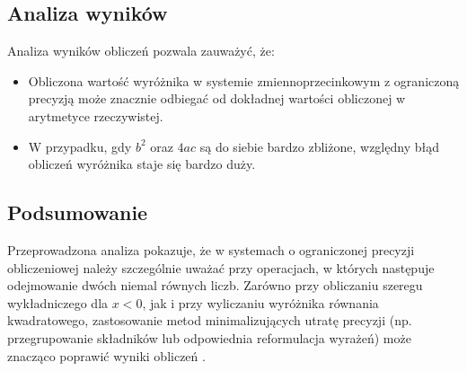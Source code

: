 \documentclass{article}
\begin{document}
\newpage

\subsection{Analiza wyników}

Analiza wyników obliczeń pozwala zauważyć, że:
\begin{itemize}
    \item Obliczona wartość wyróżnika w systemie zmiennoprzecinkowym z ograniczoną precyzją może znacznie odbiegać od dokładnej wartości obliczonej w arytmetyce rzeczywistej.
    \item W przypadku, gdy \(b^2\) oraz \(4ac\) są do siebie bardzo zbliżone, względny błąd obliczeń wyróżnika staje się bardzo duży.
\end{itemize}

\subsection{Podsumowanie}

Przeprowadzona analiza pokazuje, że w systemach o ograniczonej precyzji obliczeniowej należy szczególnie uważać przy operacjach, w których następuje odejmowanie dwóch niemal równych liczb. Zarówno przy obliczaniu szeregu wykładniczego dla \(x<0\), jak i przy wyliczaniu wyróżnika równania kwadratowego, zastosowanie metod minimalizujących utratę precyzji (np. przegrupowanie składników lub odpowiednia reformulacja wyrażeń) może znacząco poprawić wyniki obliczeń \cite{Higham2002,Goldberg1991}.



\end{document}

